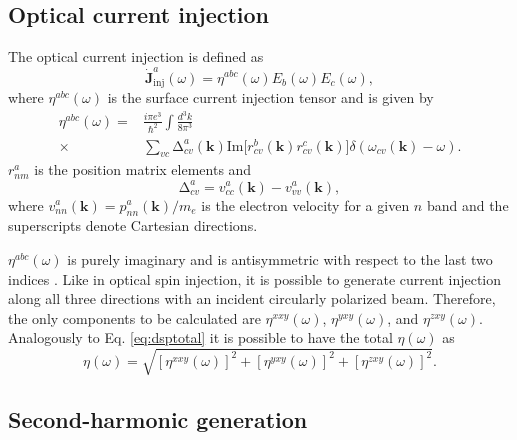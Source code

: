 \documentclass[pss]{wiley2sp} %
\begin{document}
\subsection{Optical current injection}\label{sec:theory-OCI}

The optical current injection is defined as
\begin{equation*}
\mathbf{\dot{J}}^{a}_{\text{inj}}(\omega) =
\eta^{abc}(\omega)E_{b}(\omega)E_{c}(\omega), \label{eq:eta}
\end{equation*}
where $\eta^{abc}(\omega)$ is the surface current injection tensor and is given by
\begin{align*}
\eta^{abc}(\omega) =& \frac{i\pi e^{3}}{\hbar^{2}}\int\frac{d^{3}k}{8\pi^{3}}
\nonumber \\
\times &
\sum_{vc}\mathrm{\Delta}^{a}_{cv}(\mathbf{k})\text{Im}\big[r^{b}_{cv}(\mathbf{k})
r^{c}_{cv}(\mathbf{k})\big]\delta(\omega_{cv}(\mathbf{k})-\omega).
\end{align*}
$r^{a}_{nm}$ is the position matrix elements and 
\begin{equation*}
\mathrm{\Delta}^{a}_{cv} = v^{a}_{cc}(\mathbf{k})-v^{a}_{vv}(\mathbf{k}),
\end{equation*}
where $v^{a}_{nn}(\mathbf{k})=p^{a}_{nn}(\mathbf{k})/m_{e}$ is the electron
velocity for a given $n$ band and the superscripts denote Cartesian
directions.

$\eta^{abc}(\omega)$ is purely imaginary and is antisymmetric with respect to
the last two indices \cite{sipePRB00,nastosPRB06}. Like in optical spin
injection, it is possible to generate current injection along all three
directions with an incident circularly polarized beam. Therefore, the only
components to be calculated are $\eta^{xxy}(\omega)$, $\eta^{yxy}(\omega)$,
and $\eta^{zxy}(\omega)$. Analogously to Eq.
\eqref{eq:dsptotal} it is possible to have the total $\eta(\omega)$ as
\begin{equation}\label{eq:etatotal}
\eta(\omega) =
\sqrt{[\eta^{xxy}(\omega)]^{2} +
      [\eta^{yxy}(\omega)]^{2} +
      [\eta^{zxy}(\omega)]^{2}
      }.
\end{equation}


\subsection{Second-harmonic generation}\label{sec:theory-SHG}
\end{document}

